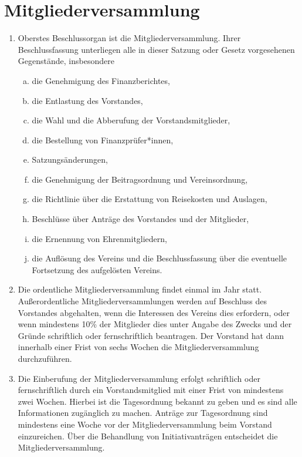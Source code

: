 \documentclass[a4paper]{article}
\begin{document}
\section{Mitgliederversammlung}
\begin{enumerate}
	\item Oberstes Beschlussorgan ist die Mitgliederversammlung. Ihrer Beschlussfassung unterliegen alle in dieser Satzung oder Gesetz vorgesehenen Gegenstände, insbesondere
	\begin{enumerate}[a)]
		\item die Genehmigung des Finanzberichtes,
		\item die Entlastung des Vorstandes,
		\item die Wahl und die Abberufung der Vorstandsmitglieder,
		\item die Bestellung von Finanzprüfer*innen,
		\item Satzungsänderungen,
		\item die Genehmigung der Beitragsordnung und Vereinsordnung,
		\item die Richtlinie über die Erstattung von Reisekosten und Auslagen,
		\item Beschlüsse über Anträge des Vorstandes und der Mitglieder,
		\item die Ernennung von Ehrenmitgliedern,
		\item die Auflösung des Vereins und die Beschlussfassung über die eventuelle Fortsetzung des aufgelösten Vereins.
	\end{enumerate}
	\item Die ordentliche Mitgliederversammlung findet einmal im Jahr statt. Außerordentliche Mitgliederversammlungen werden auf Beschluss des Vorstandes abgehalten, wenn die Interessen des Vereins dies erfordern, oder wenn mindestens 10\% der Mitglieder dies unter Angabe des Zwecks und der Gründe schriftlich oder fernschriftlich beantragen. Der Vorstand hat dann innerhalb einer Frist von sechs Wochen die Mitgliederversammlung durchzuführen. 

	\item Die Einberufung der Mitgliederversammlung erfolgt schriftlich oder fernschriftlich durch ein Vorstandsmitglied mit einer Frist von mindestens zwei Wochen. Hierbei ist die Tagesordnung bekannt zu geben und es sind alle Informationen zugänglich zu machen. Anträge zur Tagesordnung sind mindestens eine Woche vor der Mitgliederversammlung beim Vorstand einzureichen. Über die Behandlung von Initiativanträgen entscheidet die Mitgliederversammlung.


\end{enumerate}
\end{document}
